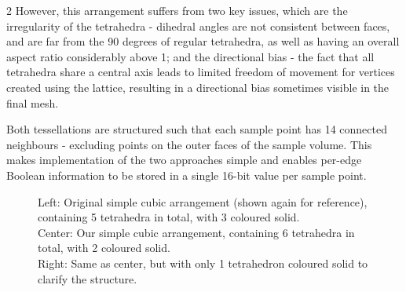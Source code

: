 \documentclass[]{article}
\begin{document}
\begin{multicols}{2}
However, this arrangement suffers from two key issues, which are the irregularity of the tetrahedra - dihedral angles are not consistent between faces, and are far from the 90 degrees of regular tetrahedra, as well as having an overall aspect ratio considerably above 1; and the directional bias - the fact that all tetrahedra share a central axis leads to limited freedom of movement for vertices created using the lattice, resulting in a directional bias sometimes visible in the final mesh.

Both tessellations are structured such that each sample point has 14 connected neighbours - excluding points on the outer faces of the sample volume. This makes implementation of the two approaches simple and enables per-edge Boolean information to be stored in a single 16-bit value per sample point.

\end{multicols}
\begin{figure}[htb]
    \centering
    
    \caption{Left: Original simple cubic arrangement (shown again for reference), containing 5 tetrahedra in total, with 3 coloured solid.\\
Center: Our simple cubic arrangement, containing 6 tetrahedra in total, with 2 coloured solid.\\
Right: Same as center, but with only 1 tetrahedron coloured solid to clarify the structure.}
    \label{fig:simparr}
\end{figure}
\FloatBarrier
\end{document}
